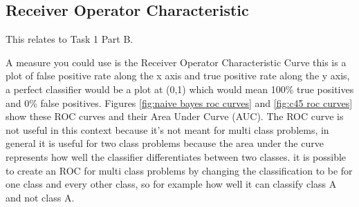 \documentclass[10pt]{article}
\begin{document}
\begin{appendices}
\section{Receiver Operator Characteristic}
\label{appendix:roc}
This relates to Task 1 Part B.

A measure you could use is the Receiver Operator Characteristic Curve this is a plot of false positive rate along the x axis and true positive rate along the y axis, a perfect classifier would be a plot at (0,1) which would mean 100\% true positives and 0\% false positives. Figures \ref{fig:naive bayes roc curves} and \ref{fig:c45 roc curves} show these ROC curves and their Area Under Curve (AUC). The ROC curve is not useful in this context because it's not meant for multi class problems, in general it is useful for two class problems\cite{Hand2009} because the area under the curve represents how well the classifier differentiates between two classes. it is possible to create an ROC for multi class problems by changing the classification to be for one class and every other class, so for example how well it can classify class A and not class A. 


\end{appendices}
\end{document}
